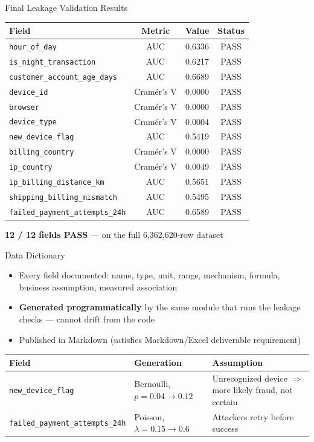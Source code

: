 \documentclass[aspectratio=169]{beamer}
\begin{document}
\begin{frame}{Final Leakage Validation Results}
\centering\scriptsize
\begin{tabular}{@{}lccc@{}}
\toprule
\textbf{Field} & \textbf{Metric} & \textbf{Value} & \textbf{Status} \\
\midrule
\texttt{hour\_of\_day} & AUC & 0.6336 & PASS \\
\texttt{is\_night\_transaction} & AUC & 0.6217 & PASS \\
\texttt{customer\_account\_age\_days} & AUC & 0.6689 & PASS \\
\texttt{device\_id} & Cram\'er's V & 0.0000 & PASS \\
\texttt{browser} & Cram\'er's V & 0.0000 & PASS \\
\texttt{device\_type} & Cram\'er's V & 0.0004 & PASS \\
\texttt{new\_device\_flag} & AUC & 0.5419 & PASS \\
\texttt{billing\_country} & Cram\'er's V & 0.0000 & PASS \\
\texttt{ip\_country} & Cram\'er's V & 0.0049 & PASS \\
\texttt{ip\_billing\_distance\_km} & AUC & 0.5651 & PASS \\
\texttt{shipping\_billing\_mismatch} & AUC & 0.5495 & PASS \\
\texttt{failed\_payment\_attempts\_24h} & AUC & 0.6589 & PASS \\
\bottomrule
\end{tabular}
\vspace{0.3cm}
\begin{center}
\Large \textbf{12 / 12 fields PASS} --- on the full 6,362,620-row dataset
\end{center}
\end{frame}

\begin{frame}{Data Dictionary}
\begin{itemize}
    \item Every field documented: name, type, unit, range, mechanism, formula, business assumption, measured association
    \item \textbf{Generated programmatically} by the same module that runs the leakage checks --- cannot drift from the code
    \item Published in Markdown (satisfies Markdown/Excel deliverable requirement)
\end{itemize}
\vspace{0.3cm}
\footnotesize
\begin{tabular}{@{}lp{3cm}p{5cm}@{}}
\toprule
\textbf{Field} & \textbf{Generation} & \textbf{Assumption} \\
\midrule
\texttt{new\_device\_flag} & Bernoulli, \(p{=}0.04{\to}0.12\) & Unrecognized device \(\Rightarrow\) more likely fraud, not certain \\
\texttt{failed\_payment\_attempts\_24h} & Poisson, \(\lambda{=}0.15{\to}0.6\) & Attackers retry before success \\
\bottomrule
\end{tabular}
\end{frame}
\end{document}
